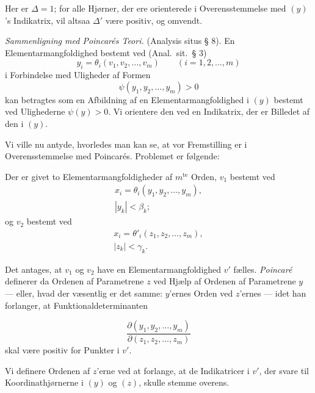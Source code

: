 \documentclass{article}
\begin{document}
Her er $\Delta = 1$; for alle Hjørner, der ere orienterede i Overensstemmelse med $(y)$'s Indikatrix, vil altsaa $\Delta'$ være positiv, og omvendt.

\emph{Sammenligning med Poincarés Teori.} (Analysis situs § 8). En Elementarmangfoldighed bestemt ved (Anal.\ sit.\ § 3)
\[
y_i = \theta_i(v_1, v_2, \dots, v_m) \qquad (i = 1, 2, \dots, m)
\]
i Forbindelse med Uligheder af Formen
\[
\psi(y_1, y_2, \dots, y_m) > 0
\]
kan betragtes som en Afbildning af en Elementarmangfoldighed i $(y)$ bestemt ved Ulighederne $\psi(y) > 0$. Vi orientere den ved en Indikatrix, der er Billedet af den i $(y)$.

Vi ville nu antyde, hvorledes man kan se, at vor Fremstilling er i Overensstemmelse med Poincarés. Problemet er følgende:

Der er givet to Elementarmangfoldigheder af $m^{\text{te}}$ Orden, $v_1$ bestemt ved
\[
\begin{gathered}
x_i = \theta_i(y_1, y_2, \dots, y_m), \tag{1} \\
|y_k| < \beta_k;
\end{gathered}
\]
og $v_2$ bestemt ved
\[
\begin{gathered}
x_i = {\theta'}_i(z_1, z_2, \dots, z_m), \tag{2} \\
|z_k| < \gamma_k.
\end{gathered}
\]

Det antages, at $v_1$ og $v_2$ have en Elementarmangfoldighed $v'$ fælles. \emph{Poincaré} definerer da Ordenen af Parametrene $z$ ved Hjælp af Ordenen af Parametrene $y$ --- eller, hvad der væsentlig er det samme: $y$'ernes Orden ved $z$'ernes --- idet han forlanger, at Funktionaldeterminanten

\[
\frac{\partial(y_1, y_2, \dots, y_m)}{\partial(z_1, z_2, \dots, z_m)}
\]
skal være positiv for Punkter i $v'$.

Vi definere Ordenen af $z$'erne ved at forlange, at de Indikatricer i $v'$, der svare til Koordinathjørnerne i $(y)$ og $(z)$, skulle stemme overens.
\end{document}
